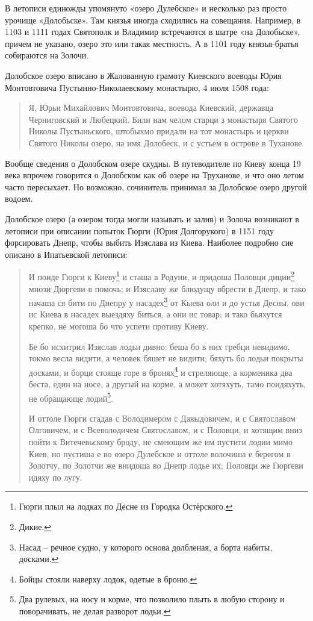 В летописи единожды упомянуто «озеро Дулебское» и несколько раз просто урочище «Долобьске». Там князья иногда сходились на совещания. Например, в 1103 и 1111 годах Святополк и Владимир встречаются в шатре «на Долобьске», причем не указано, озеро это или такая местность. А в 1101 году князья-братья собираются на Золочи.

Долобское озеро вписано в Жалованную грамоту Киевского воеводы Юрия Монтовтовича Пустынно-Никола\-евскому монастырю, 4 июля 1508 года:

\begin{quotation}
Я, Юрьи Михайлович Монтовтовича, воевода Киевский, державца Черниговский и Любецкий. Били нам челом старци з монастыря Святого Николы Пустыньского, штобыхмо придали на тот монастырь и церкви Святого Николы озеро, на имя Долобеск, и с устьем в острове в Туханове.
\end{quotation}

Вообще сведения о Долобском озере скудны. В путеводителе по Киеву конца 19 века впрочем говорится о Долобском как об озере на Труханове, и что оно летом часто пересыхает. Но возможно, сочинитель принимал за Долобское озеро другой водоем.

Долобское озеро (а озером тогда могли называть и залив) и Золоча возникают в летописи при описании попыток Гюрги (Юрия Долгорукого) в 1151 году форсировать Днепр, чтобы выбить Изяслава из Киева. Наиболее подробно сие описано в Ипатьевской летописи:

\begin{quotation}
И поиде Гюрги к Киеву\footnote{Гюрги плыл на лодках по Десне из Городка Остёрского.} и сташа в Родуни, и придоша Половци диции\footnote{Дикие.} мнози Дюргеви в помочь; и Изяславу же блюдущу вбрести в Днепр, и тако начаша ся бити по Днепру у насадех\footnote{Насад – речное судно, у которого основа долбленая, а борта набиты, досками.} от Кыева оли и до устья Десны, ови ис Киева в насадех выездяху биться, а они ис товар; и тако бьяхутся крепко, не могоша бо что успети противу Киеву. 

Бе бо исхитрил Изяслав лодьи дивно: беша бо в них гребци невидимо, токмо весла видити, а человек бяшет не видити; бяхуть бо лодьи покрыты досками, и борци стояще горе в бронях\footnote{Бойцы стояли наверху лодок, одетые в броню.} и стреляюще, а корменика два беста, един на носе, а другый на корме, а может хотяхуть, тамо поидяхуть, не обращающе лодий\footnote{Два рулевых, на носу и корме, что позволило плыть в любую сторону и поворачивать, не делая разворот лодьи.}.

И оттоле Гюрги сгадав с Володимером с Давыдовичем, и с Святославом Олговичем, и с Всеволодичем Святославом, и с Половци, и хотящим вниз пойти к Витечевьскому броду, не смеющим же им пустити лодии мимо Киев, но пустиша е во озеро Дулебское и оттоле волочиша е берегом в Золотчу, по Золотчи же внидоша во Днепр лодье их; Половци же Гюргеви идяху по лугу.
\end{quotation}

